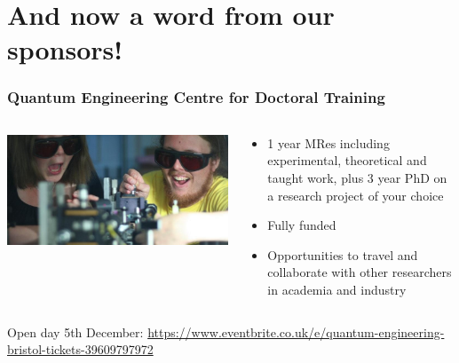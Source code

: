 \documentclass[notes]{beamer}
\begin{document}
\section{And now a word from our sponsors!}

\begin{frame}
\frametitle{Quantum Engineering Centre for Doctoral Training}

  \begin{columns}[T]
    \begin{column}{.5\textwidth}
    \begin{center}
    \includegraphics[scale=0.2]{cdt_open_day}
    \end{center}
    \end{column}
    \begin{column}{.5\textwidth}
    \begin{itemize}
    \item 1 year MRes including experimental, theoretical and taught work, plus 3 year PhD on a research project of your choice
    
    \item Fully funded
    
    \item Opportunities to travel and collaborate with other researchers in academia and industry
    \end{itemize}
    \end{column}
  \end{columns}
  
  Open day 5th December: \url{https://www.eventbrite.co.uk/e/quantum-engineering-bristol-tickets-39609797972}

\end{frame}

\end{document}
